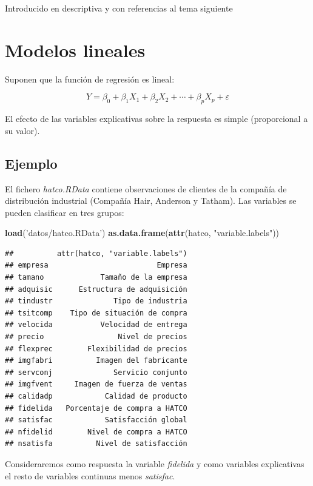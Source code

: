 \documentclass[]{book}
\newenvironment{Shaded}{\begin{snugshade}}{\end{snugshade}}
\newcommand{\KeywordTok}[1]{\textcolor[rgb]{0.13,0.29,0.53}{\textbf{#1}}}
\newcommand{\NormalTok}[1]{#1}
\newcommand{\StringTok}[1]{\textcolor[rgb]{0.31,0.60,0.02}{#1}}
\begin{document}
Introducido en descriptiva y con referencias al tema siguiente

\hypertarget{modelos-lineales}{%
\chapter{Modelos lineales}\label{modelos-lineales}}

Suponen que la función de regresión es lineal:

\[Y=\beta_{0}+\beta_{1}X_{1}+\beta_{2}X_{2}+\cdots+\beta_{p}X_{p}+\varepsilon\]

El efecto de las variables explicativas sobre la respuesta es simple (proporcional a su valor).

\hypertarget{ejemplo}{%
\section{Ejemplo}\label{ejemplo}}

El fichero \emph{hatco.RData} contiene observaciones de clientes de la compañía de
distribución industrial (Compañía Hair, Anderson y Tatham).
Las variables se pueden clasificar en tres grupos:

\begin{Shaded}
\begin{Highlighting}[]
\KeywordTok{load}\NormalTok{(}\StringTok{'datos/hatco.RData'}\NormalTok{)}
\KeywordTok{as.data.frame}\NormalTok{(}\KeywordTok{attr}\NormalTok{(hatco, }\StringTok{"variable.labels"}\NormalTok{))}
\end{Highlighting}
\end{Shaded}

\begin{verbatim}
##          attr(hatco, "variable.labels")
## empresa                         Empresa
## tamano             Tamaño de la empresa
## adquisic      Estructura de adquisición
## tindustr              Tipo de industria
## tsitcomp    Tipo de situación de compra
## velocida           Velocidad de entrega
## precio                 Nivel de precios
## flexprec        Flexibilidad de precios
## imgfabri          Imagen del fabricante
## servconj              Servicio conjunto
## imgfvent     Imagen de fuerza de ventas
## calidadp            Calidad de producto
## fidelida   Porcentaje de compra a HATCO
## satisfac            Satisfacción global
## nfidelid        Nivel de compra a HATCO
## nsatisfa          Nivel de satisfacción
\end{verbatim}

Consideraremos como respuesta la variable \emph{fidelida} y como variables explicativas
el resto de variables continuas menos \emph{satisfac}.
\end{document}

